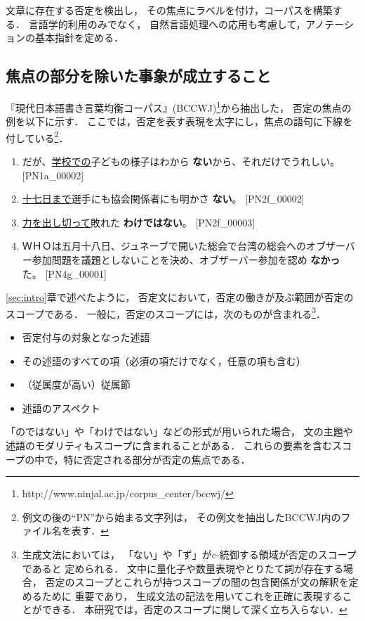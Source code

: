 \documentclass[japanese]{jnlp_1.4}
\begin{document}
文章に存在する否定を検出し，
その焦点にラベルを付け，コーパスを構築する．
言語学的利用のみでなく，
自然言語処理への応用も考慮して，アノテーションの基本指針を定める．


\subsection{焦点の部分を除いた事象が成立すること}
\label{subsec:hold}

『現代日本語書き言葉均衡コーパス』(BCCWJ)\footnote{
http://www.ninjal.ac.jp/corpus\_center/bccwj/}から抽出した，
否定の焦点の例を以下に示す．
ここでは，否定を表す表現を太字にし，焦点の語句に下線を付している\footnote{
例文の後の``PN''から始まる文字列は，
その例文を抽出したBCCWJ内のファイル名を表す．}．
\begin{enumerate}
\item[(3)] だが、\underline{学校での}子どもの様子はわから
  \textbf{ない}から、それだけでうれしい。 [PN1a\_00002]
\item[(4)] \underline{十七日まで}選手にも協会関係者にも明かさ
  \textbf{ない}。 [PN2f\_00002]
\item[(5)] \underline{力を出し切って}敗れた
  \textbf{わけではない}。 [PN2f\_00003]
\item[(6)] ＷＨＯは五月十八日、ジュネーブで開いた総会で台湾の総会へのオブザーバー参加問題を議題としないことを決め、オブザーバー参加を認め
  \textbf{なかっ}た。 [PN4g\_00001]
\end{enumerate}

\ref{sec:intro}章で述べたように，
否定文において，否定の働きが及ぶ範囲が否定のスコープである\cite{neg2007}．
一般に，否定のスコープには，次のものが含まれる\footnote{
生成文法においては，
「ない」や「ず」がc-統御する領域が否定のスコープであると
定められる\cite{kato2010,Kataoka2006}．
文中に量化子や数量表現やとりたて詞が存在する場合，
否定のスコープとこれらが持つスコープの間の包含関係が文の解釈を定めるために
重要であり，
生成文法の記法を用いてこれを正確に表現することができる．
本研究では，否定のスコープに関して深く立ち入らない．}．
\begin{itemize}
\item 否定付与の対象となった述語
\item その述語のすべての項（必須の項だけでなく，任意の項も含む）
\item （従属度が高い）従属節
\item 述語のアスペクト
\end{itemize}
「のではない」や「わけではない」などの形式が用いられた場合，
文の主題や述語のモダリティもスコープに含まれることがある．
これらの要素を含むスコープの中で，特に否定される部分が否定の焦点である．
\end{document}
